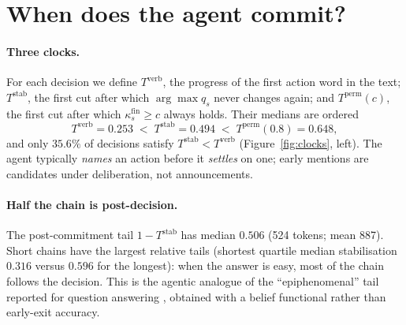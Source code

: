 \documentclass{article}
\newcommand{\qvec}{q}
\newcommand{\kfin}{\kappa^{\mathrm{fin}}}
\newcommand{\Tstab}{T^{\mathrm{stab}}}
\newcommand{\Tverb}{T^{\mathrm{verb}}}
\newcommand{\Tperm}{T^{\mathrm{perm}}}
\begin{document}
\section{When does the agent commit?}
\label{sec:when}

\paragraph{Three clocks.} For each decision we define $\Tverb$, the progress of the first
action word in the text; $\Tstab$, the first cut after which $\arg\max \qvec_s$ never
changes again; and $\Tperm(c)$, the first cut after which $\kfin_s \ge c$ always holds.
Their medians are ordered
\begin{equation}
\Tverb = 0.253 \;<\; \Tstab = 0.494 \;<\; \Tperm(0.8) = 0.648 ,
\end{equation}
and only $35.6\%$ of decisions satisfy $\Tstab < \Tverb$ (Figure~\ref{fig:clocks}, left).
The agent typically \emph{names} an action before it \emph{settles} on one; early mentions
are candidates under deliberation, not announcements.

\paragraph{Half the chain is post-decision.} The post-commitment tail $1-\Tstab$ has median
$0.506$ (524 tokens; mean 887). Short chains have the largest relative tails (shortest
quartile median stabilisation $0.316$ versus $0.596$ for the longest): when the answer is
easy, most of the chain follows the decision. This is the agentic analogue of the
``epiphenomenal'' tail reported for question answering \citep{boundary2026}, obtained with
a belief functional rather than early-exit accuracy.
\end{document}
